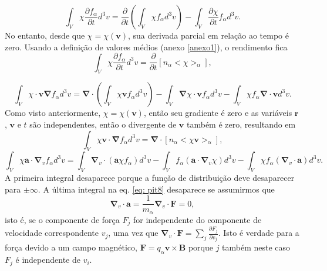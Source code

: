 \documentclass[12pt,oneside,a4paper]{abntex2}
\begin{document}
\begin{equation}
\label{eq: pit4.01}
\int_V \chi \frac{\partial f_\alpha}{\partial t} d^3 v  = \frac{\partial }{\partial t} (\int_V \chi f_\alpha d^3 v)-\int_V \frac{\partial \chi}{\partial t} f_\alpha d^3 v.
\end{equation}
No entanto, desde que $\chi = \chi(\bm{v})$, sua derivada parcial em relação ao tempo é zero. Usando a definição de valores médios (anexo \ref{anexo1}), o rendimento fica
\begin{equation}
\label{eq: pit5.01}
\int_V \chi \frac{\partial f_\alpha}{\partial t} d^3 v = \frac{\partial}{\partial t} [n_\alpha<\chi>_\alpha],
\end{equation}

\begin{equation}
\label{eq: pit6.01}
\int_V \chi \cdot \bm{v} \bm{\nabla} f_\alpha d^3 v = \bm{\nabla} \cdot \left( \int_V \chi \bm{v} f_\alpha d^3 v \right) - \int_V \bm{\nabla} \chi \cdot \bm{v} f_\alpha d^3 v - \int_V \chi  f_\alpha \bm{\nabla} \cdot \bm{v}  d^3 v.
\end{equation}
Como visto anteriormente, $\chi = \chi(\bm{v})$, então seu gradiente é zero e as variáveis $\bm{r}$, $\bm{v}$ e $t$ são independentes, então o divergente de $\bm{v}$ também é zero, resultando em
\begin{equation}
\label{eq: pit7}
\int_V \chi \bm{v} \cdot \bm{\nabla} f_\alpha d^3 v = \bm{\nabla} \cdot [n_\alpha<\chi \bm{v}>_\alpha],
\end{equation}
\begin{equation}
\label{eq: pit8}
\int_V \chi \bm{a} \cdot \bm{\nabla}_v f_\alpha d^3 v = \int_V \bm{\nabla}_v \cdot (\bm{a} \chi f_\alpha)d^3 v - \int_V f_\alpha (\bm{a} \cdot \bm{\nabla}_v \chi) d^3 v - \int_V \chi  f_\alpha (\bm{\nabla}_v \cdot \bm{a})  d^3 v.
\end{equation}
A primeira integral desaparece porque a função de distribuição deve desaparecer para $\pm \infty$. A última integral na eq. \ref{eq: pit8} desaparece se assumirmos que
\begin{equation}
\label{eq: pit9}
\bm{\nabla}_v \cdot \bm{a} = \frac{1}{m_\alpha} \bm{\nabla}_v \cdot \bm{F} = 0,
\end{equation}
isto é, se o componente de força $F_j$ for independente do componente de velocidade correspondente $v_j$, uma vez que $\bm{\nabla}_v \cdot \bm{F} = \sum_j \frac{\partial F_j}{\partial v_j}$. Isto é verdade para a força devido a um campo magnético, $\bm{F} = q_\alpha \bm{v} \times \bm{B}$ porque $j$ também neste caso $F_j$ é independente de $v_i$.
\end{document}
